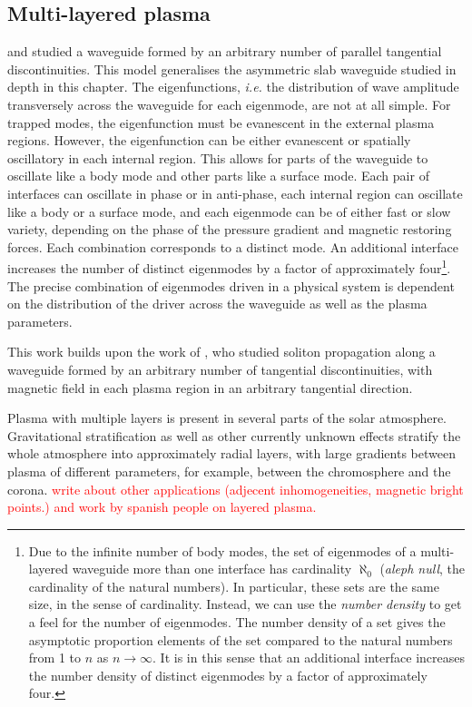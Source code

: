 \documentclass[12pt]{../style-files/ociamthesis}
\begin{document}
\subsection{Multi-layered plasma}
\cite{shu_etal18} and \cite{all_etal19} studied a waveguide formed by an arbitrary number of parallel tangential discontinuities. This model generalises the asymmetric slab waveguide studied in depth in this chapter. The eigenfunctions, \textit{i.e.} the distribution of wave amplitude transversely across the waveguide for each eigenmode, are not at all simple. For trapped modes, the eigenfunction must be evanescent in the external plasma regions. However, the eigenfunction can be either evanescent or spatially oscillatory in each internal region. This allows for parts of the waveguide to oscillate like a body mode and other parts like a surface mode. Each pair of interfaces can oscillate in phase or in anti-phase, each internal region can oscillate like a body or a surface mode, and each eigenmode can be of either fast or slow variety, depending on the phase of the pressure gradient and magnetic restoring forces. Each combination corresponds to a distinct mode. An additional interface increases the number of distinct eigenmodes by a factor of approximately four\footnote{Due to the infinite number of body modes, the set of eigenmodes of a multi-layered waveguide more than one interface has cardinality $\aleph_0$ (\textit{aleph null}, the cardinality of the natural numbers). In particular, these sets are the same size, in the sense of cardinality. Instead, we can use the \textit{number density} to get a feel for the number of eigenmodes. The number density of a set gives the asymptotic proportion elements of the set compared to the natural numbers from 1 to $n$ as $n \to \infty$. It is in this sense that an additional interface increases the number density of distinct eigenmodes by a factor of approximately four.}. The precise combination of eigenmodes driven in a physical system is dependent on the distribution of the driver across the waveguide as well as the plasma parameters.

This work builds upon the work of \cite{rud92}, who studied soliton propagation along a waveguide formed by an arbitrary number of tangential discontinuities, with magnetic field in each plasma region in an arbitrary tangential direction.

Plasma with multiple layers is present in several parts of the solar atmosphere. Gravitational stratification as well as other currently unknown effects stratify the whole atmosphere into approximately radial layers, with large gradients between plasma of different parameters, for example, between the chromosphere and the corona. \textcolor{red}{write about other applications (adjecent inhomogeneities, magnetic bright points.) and work by spanish people on layered plasma.} 
\end{document}
